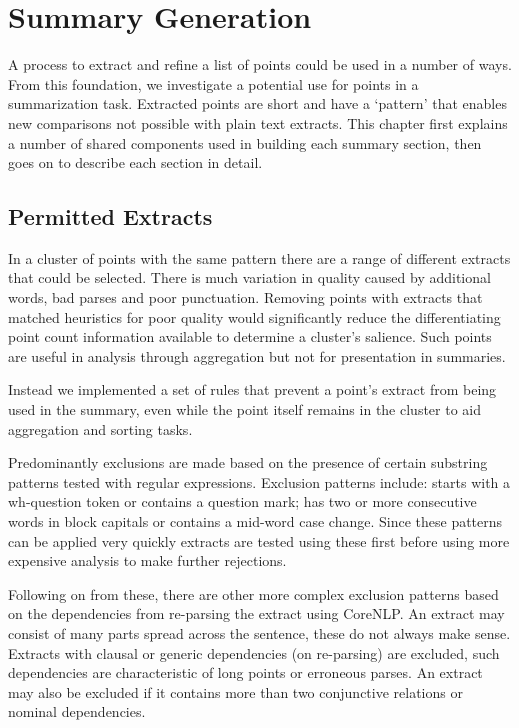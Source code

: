 \chapter{Summary Generation\label{chap:summary-generation}}
  A process to extract and refine a list of points could be used in a number of ways. From this foundation, we investigate a potential use for points in a summarization task. Extracted points are short and have a `pattern' that enables new comparisons not possible with plain text extracts. This chapter first explains a number of shared components used in building each summary section, then goes on to describe each section in detail.

  \section{Permitted Extracts}
    In a cluster of points with the same pattern there are a range of different extracts that could be selected. There is much variation in quality caused by additional words, bad parses and poor punctuation. Removing points with extracts that matched heuristics for poor quality would significantly reduce the differentiating point count information available to determine a cluster's salience. Such points are useful in analysis through aggregation but not for presentation in summaries.

    Instead we implemented a set of rules that prevent a point's extract from being used in the summary, even while the point itself remains in the cluster to aid aggregation and sorting tasks.

    Predominantly exclusions are made based on the presence of certain substring patterns tested with regular expressions. Exclusion patterns include: starts with a wh-question token or contains a question mark; has two or more consecutive words in block capitals or contains a mid-word case change. Since these patterns can be applied very quickly extracts are tested using these first before using more expensive analysis to make further rejections.

    Following on from these, there are other more complex exclusion patterns based on the dependencies from re-parsing the extract using CoreNLP. An extract may consist of many parts spread across the sentence, these do not always make sense. Extracts with clausal or generic dependencies (on re-parsing) are excluded, such dependencies are characteristic of long points or erroneous parses. An extract may also be excluded if it contains more than two conjunctive relations or nominal dependencies.

